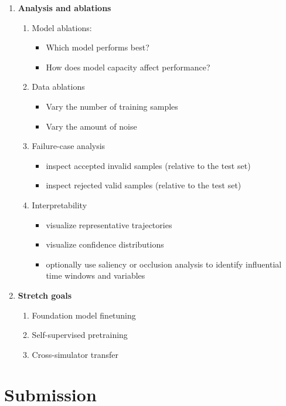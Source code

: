 \documentclass[11pt]{article}
\begin{document}
\begin{enumerate}[label=\arabic*.]
    \item \textbf{Analysis and ablations}
    \begin{enumerate}[label=\arabic{enumi}.\arabic*.]
        \item Model ablations:
        \begin{itemize}
            \item Which model performs best?
            \item How does model capacity affect performance?
        \end{itemize}
        \item Data ablations
        \begin{itemize}
            \item Vary the number of training samples
            \item Vary the amount of noise
        \end{itemize}
        \item Failure-case analysis
        \begin{itemize}
            \item inspect accepted invalid samples (relative to the test set)
            \item inspect rejected valid samples (relative to the test set)
        \end{itemize}
        \item Interpretability
        \begin{itemize}
            \item visualize representative trajectories
            \item visualize confidence distributions
            \item optionally use saliency or occlusion analysis to identify influential time windows and variables
        \end{itemize}
    \end{enumerate}

    \item \textbf{Stretch goals}
    \begin{enumerate}[label=\arabic{enumi}.\arabic*.]
        \item Foundation model finetuning
        \item Self-supervised pretraining
        \item Cross-simulator transfer
    \end{enumerate}
\end{enumerate}

\section*{Submission}
\end{document}
